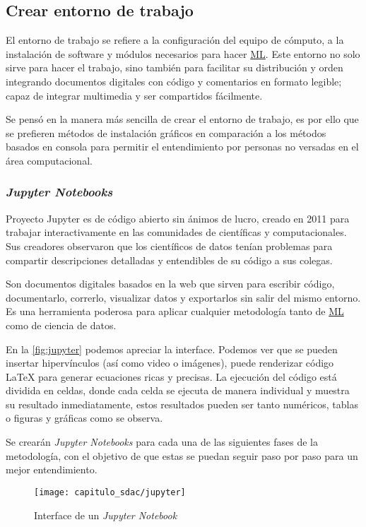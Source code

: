\subsection{Crear entorno de trabajo}

El entorno de trabajo se refiere a la configuración del equipo de cómputo, a la
instalación de software y módulos necesarios para hacer \hyperlink{abbr}{ML}.
Este entorno no solo sirve para hacer el trabajo, sino también para facilitar su
distribución y orden integrando documentos digitales con código y comentarios en
formato legible; capaz de integrar multimedia y ser compartidos fácilmente.

Se pensó en la manera más sencilla de crear el entorno de trabajo, es por ello
que se prefieren métodos de instalación gráficos en comparación a los métodos
basados en consola para permitir el entendimiento por personas no versadas en el
área computacional.

\subsubsection{\emph{Jupyter Notebooks}}

Proyecto Jupyter es de código abierto sin ánimos de lucro, creado en 2011 para
trabajar interactivamente en las comunidades de científicas y computacionales.
Sus creadores observaron que los científicos de datos tenían problemas para
compartir descripciones detalladas y entendibles de su código a sus colegas. 

Son documentos digitales basados en la web que sirven para escribir código,
documentarlo, correrlo, visualizar datos y exportarlos sin salir del mismo
entorno. Es una herramienta poderosa para aplicar cualquier metodología tanto de
\hyperlink{abbr}{ML} como de ciencia de datos.

En la \autoref{fig:jupyter} podemos apreciar la interface. Podemos ver que se
pueden insertar hipervínculos (así como video o imágenes), puede renderizar
código \LaTeX{} para generar ecuaciones ricas y precisas. La ejecución del código
está dividida en celdas, donde cada celda se ejecuta de manera individual y
muestra su resultado inmediatamente, estos resultados pueden ser tanto
numéricos, tablas o figuras y gráficas como se observa.

Se crearán \emph{Jupyter Notebooks} para cada una de las siguientes fases de la
metodología, con el objetivo de que estas se puedan seguir paso por paso para un
mejor entendimiento.

\begin{figure}[H]
    \centering
    \texttt{[image: capitulo\_sdac/jupyter]}
    \caption{Interface de un \emph{Jupyter Notebook}}\label{fig:jupyter}
\end{figure}
    
